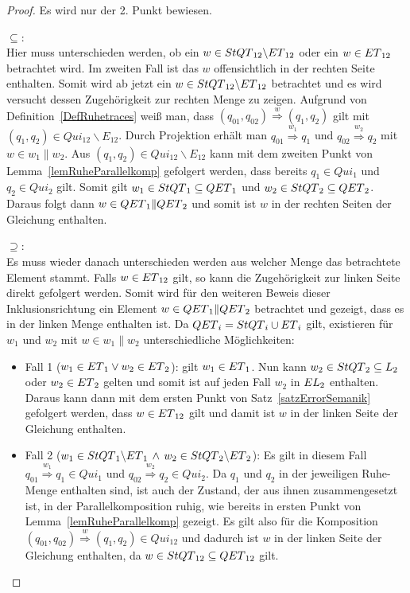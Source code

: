 \begin{proof}
  Es wird nur der 2. Punkt bewiesen.

  \glqq{}$\subseteq$\grqq{}:\\
  Hier muss unterschieden werden, ob ein $w\in StQT{}_{12}\backslash ET{}_{12}$
  oder ein $w\in ET{}_{12}$ betrachtet wird. Im zweiten Fall ist das
  $w$ offensichtlich in der rechten Seite enthalten. Somit wird ab jetzt ein $w\in
  StQT{}_{12}\backslash ET{}_{12}$ betrachtet und es wird versucht dessen
  Zugehörigkeit zur rechten Menge zu zeigen. Aufgrund von
  Definition~\ref{DefRuhetraces} weiß man, dass $(q_{01},q_{02})
  \overset{w}{\Rightarrow} (q_1,q_2)$ gilt mit $(q_1,q_2)\in Qui_{12}\backslash
  E_{12}$. Durch Projektion erhält man $q_{01} \overset{w_1}{\Rightarrow} q_1$
  und $q_{02} \overset{w_2}{\Rightarrow} q_2$ mit $w\in w_1\|w_2$. Aus
  $(q_1,q_2)\in Qui_{12}\backslash E_{12}$ kann mit dem zweiten Punkt von
  Lemma~\ref{lemRuheParallelkomp} gefolgert werden, dass bereits $q_1\in Qui_1$
  und $q_2\in Qui_2$ gilt. Somit gilt $w_1\in StQT{}_1\subseteq QET{}_1$ und
  $w_2\in StQT{}_2\subseteq QET{}_2$. Daraus folgt dann $w\in
  QET{}_1\|QET{}_2$ und somit ist $w$ in der rechten Seiten der Gleichung
  enthalten.

  \glqq{}$\supseteq$\grqq{}:\\
  Es muss wieder danach unterschieden werden aus welcher Menge das betrachtete
  Element stammt. Falls $w\in ET{}_{12}$ gilt, so kann die
  Zugehörigkeit zur linken Seite direkt gefolgert werden. Somit wird für den
  weiteren Beweis dieser Inklusionsrichtung ein Element $w\in QET{}_1\|QET{}_2$
  betrachtet und gezeigt, dass es in der linken Menge enthalten ist. Da
  $QET{}_i = StQT{}_i\cup ET{}_i$ gilt, existieren für $w_1$ und $w_2$ mit
  $w\in w_1\| w_2$ unterschiedliche Möglichkeiten:
  \begin{itemize}
    \item Fall 1 ($w_1\in ET{}_1\vee w_2\in ET{}_2$): \OBdA{} gilt
      $w_1\in ET{}_1$. Nun kann $w_2\in StQT{}_2\subseteq L_2$
      oder $w_2\in ET{}_2$ gelten und somit ist auf jeden Fall $w_2$ in
      $EL{}_2$ enthalten. Daraus kann dann mit dem ersten Punkt von
      Satz~\ref{satzErrorSemanik} gefolgert werden, dass $w\in ET{}_{12}$ gilt
      und damit ist $w$ in der linken Seite der Gleichung enthalten.
    \item Fall 2 ($w_1\in StQT{}_1\backslash ET{}_1\,\wedge\, w_2\in
      StQT{}_2\backslash ET{}_2$): Es gilt in diesem Fall $q_{01}
      \overset{w_1}{\Rightarrow} q_1\in Qui_1$ und $q_{02}
      \overset{w_2}{\Rightarrow} q_2\in Qui_2$. Da $q_1$ und $q_2$ in der
      jeweiligen Ruhe-Menge enthalten sind, ist auch der Zustand, der aus ihnen
      zusammengesetzt ist, in der Parallelkomposition ruhig, wie bereits in
      ersten Punkt von
      Lemma~\ref{lemRuheParallelkomp} gezeigt. Es gilt also für die Komposition
      $(q_{01},q_{02}) \overset{w}{\Rightarrow} (q_1,q_2)\in Qui_{12}$ und
      dadurch ist $w$ in der linken Seite der Gleichung enthalten, da $w\in
      StQT{}_{12}\subseteq QET{}_{12}$ gilt.
  \end{itemize}
\end{proof}

